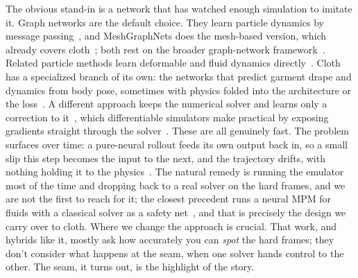 \documentclass{article}
\begin{document}
The obvious stand-in is a network that has watched enough simulation to imitate it.
Graph networks are the default choice. They learn particle dynamics by message
passing~\citep{sanchez2020gns}, and MeshGraphNets does the mesh-based version, which already covers cloth~\citep{pfaff2021mgn}; both rest on the
broader graph-network framework~\citep{battaglia2018gn}. Related particle methods
learn deformable and fluid dynamics directly~\citep{li2019dpi, ummenhofer2020cconv}.
Cloth has a specialized branch of its own: the networks that predict garment drape
and dynamics from body pose, sometimes with physics folded into the architecture or
the loss~\citep{zhao2024physcloth, bertiche2021pbns, santesteban2022snug,
grigorev2023hood}. A different approach keeps the numerical solver and learns only a
correction to it~\citep{um2020solver}, which differentiable simulators make
practical by exposing gradients straight through the solver~\citep{hu2020difftaichi}.
These are all genuinely fast. The problem surfaces over time: a pure-neural rollout
feeds its own output back in, so a small slip this step becomes the input to the
next, and the trajectory drifts, with nothing holding it to the
physics~\citep{sanchez2020gns}. The natural remedy is running the emulator most of the time and dropping
back to a real solver on the hard frames, and we are not
the first to reach for it; the closest precedent runs a neural MPM for fluids with a
classical solver as a safety net~\citep{xu2025hybridmpm}, and that is precisely the
design we carry over to cloth. Where we change the approach is crucial. That work, and
hybrids like it, mostly ask how accurately you can \emph{spot} the hard frames;
they don't consider what happens at the seam, when one solver hands control to the
other. The seam, it turns out, is the highlight of the story.
\end{document}
